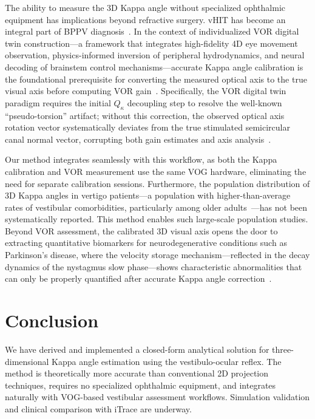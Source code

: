 \documentclass[review,numbers,sort&compress]{elsarticle}
\begin{document}
The ability to measure the 3D Kappa angle without specialized ophthalmic equipment has implications beyond refractive surgery. vHIT has become an integral part of BPPV diagnosis~\cite{MacDougall2009}. In the context of individualized VOR digital twin construction---a framework that integrates high-fidelity 4D eye movement observation, physics-informed inversion of peripheral hydrodynamics, and neural decoding of brainstem control mechanisms---accurate Kappa angle calibration is the foundational prerequisite for converting the measured optical axis to the true visual axis before computing VOR gain~\cite{Angelaki2000,Hess1999,Yang2022,Wu2022,Zhou2024}. Specifically, the VOR digital twin paradigm requires the initial $Q_\kappa$ decoupling step to resolve the well-known ``pseudo-torsion'' artifact; without this correction, the observed optical axis rotation vector systematically deviates from the true stimulated semicircular canal normal vector, corrupting both gain estimates and axis analysis~\cite{Raphan1979,Cohen1981}.

Our method integrates seamlessly with this workflow, as both the Kappa calibration and VOR measurement use the same VOG hardware, eliminating the need for separate calibration sessions. Furthermore, the population distribution of 3D Kappa angles in vertigo patients---a population with higher-than-average rates of vestibular comorbidities, particularly among older adults~\cite{Agrawal2019}---has not been systematically reported. This method enables such large-scale population studies. Beyond VOR assessment, the calibrated 3D visual axis opens the door to extracting quantitative biomarkers for neurodegenerative conditions such as Parkinson's disease, where the velocity storage mechanism---reflected in the decay dynamics of the nystagmus slow phase---shows characteristic abnormalities that can only be properly quantified after accurate Kappa angle correction~\cite{MacNeilage2010}.

\section{Conclusion}
\label{sec:conclusion}

We have derived and implemented a closed-form analytical solution for three-dimensional Kappa angle estimation using the vestibulo-ocular reflex. The method is theoretically more accurate than conventional 2D projection techniques, requires no specialized ophthalmic equipment, and integrates naturally with VOG-based vestibular assessment workflows. Simulation validation and clinical comparison with iTrace are underway.
\end{document}
